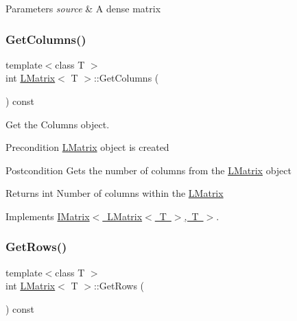 \begin{DoxyParams}{Parameters}
{\em source} & A dense matrix \\
\hline
\end{DoxyParams}
\mbox{\label{class_l_matrix_ae7adc0f92e3648751fe49852ad158ea2}} 
\subsubsection{\texorpdfstring{GetColumns()}{GetColumns()}}
{\footnotesize\ttfamily template$<$class T $>$ \\
int \mbox{\hyperlink{class_l_matrix}{L\+Matrix}}$<$ T $>$\+::Get\+Columns (\begin{DoxyParamCaption}{ }\end{DoxyParamCaption}) const\hspace{0.3cm}{\ttfamily [virtual]}}



Get the Columns object. 

\begin{DoxyPrecond}{Precondition}
\mbox{\hyperlink{class_l_matrix}{L\+Matrix}} object is created 
\end{DoxyPrecond}
\begin{DoxyPostcond}{Postcondition}
Gets the number of columns from the \mbox{\hyperlink{class_l_matrix}{L\+Matrix}} object 
\end{DoxyPostcond}
\begin{DoxyReturn}{Returns}
int Number of columns within the \mbox{\hyperlink{class_l_matrix}{L\+Matrix}} 
\end{DoxyReturn}


Implements \mbox{\hyperlink{class_i_matrix}{I\+Matrix$<$ L\+Matrix$<$ T $>$, T $>$}}.

\mbox{\label{class_l_matrix_ad4ed9d329dbd01d010504a97b3879442}} 
\subsubsection{\texorpdfstring{GetRows()}{GetRows()}}
{\footnotesize\ttfamily template$<$class T $>$ \\
int \mbox{\hyperlink{class_l_matrix}{L\+Matrix}}$<$ T $>$\+::Get\+Rows (\begin{DoxyParamCaption}{ }\end{DoxyParamCaption}) const\hspace{0.3cm}{\ttfamily [virtual]}}



